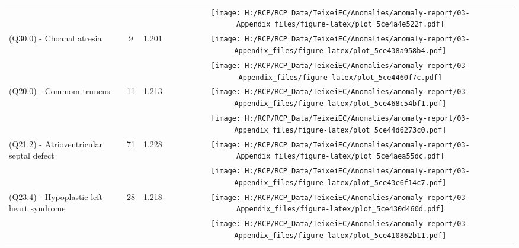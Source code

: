 \documentclass[
]{krantz}
\begin{document}
\begin{longtable}[t]{>{\raggedright\arraybackslash}m{4cm}cc>{}c}
\addlinespace
\cellcolor{gray!6}{(Q16.0, Q17.2) - Anotia / Microtia} & \cellcolor{gray!6}{14} & \cellcolor{gray!6}{1.218} & \cellcolor{gray!6}{}\texttt{[image: H:/RCP/RCP\_Data/TeixeiEC/Anomalies/anomaly-report/03-Appendix\_files/figure-latex/plot\_5ce4a4e522f.pdf]}\\
(Q30.0) - Choanal atresia & 9 & 1.201 & \texttt{[image: H:/RCP/RCP\_Data/TeixeiEC/Anomalies/anomaly-report/03-Appendix\_files/figure-latex/plot\_5ce438a958b4.pdf]}\\
\cellcolor{gray!6}{Selected congenital heart defects} & \cellcolor{gray!6}{211} & \cellcolor{gray!6}{1.226} & \cellcolor{gray!6}{}\texttt{[image: H:/RCP/RCP\_Data/TeixeiEC/Anomalies/anomaly-report/03-Appendix\_files/figure-latex/plot\_5ce4460f7c.pdf]}\\
(Q20.0) - Commom truncus & 11 & 1.213 & \texttt{[image: H:/RCP/RCP\_Data/TeixeiEC/Anomalies/anomaly-report/03-Appendix\_files/figure-latex/plot\_5ce468c54bf1.pdf]}\\
\cellcolor{gray!6}{(Q20.1, Q20.3, Q20.5) - Transposition of great vessels} & \cellcolor{gray!6}{59} & \cellcolor{gray!6}{1.228} & \cellcolor{gray!6}{}\texttt{[image: H:/RCP/RCP\_Data/TeixeiEC/Anomalies/anomaly-report/03-Appendix\_files/figure-latex/plot\_5ce44d6273c0.pdf]}\\
\addlinespace
(Q21.2) - Atrioventricular septal defect & 71 & 1.228 & \texttt{[image: H:/RCP/RCP\_Data/TeixeiEC/Anomalies/anomaly-report/03-Appendix\_files/figure-latex/plot\_5ce4aea55dc.pdf]}\\
\cellcolor{gray!6}{(Q21.3) - Tetralogy of Fallot} & \cellcolor{gray!6}{33} & \cellcolor{gray!6}{1.224} & \cellcolor{gray!6}{}\texttt{[image: H:/RCP/RCP\_Data/TeixeiEC/Anomalies/anomaly-report/03-Appendix\_files/figure-latex/plot\_5ce43c6f14c7.pdf]}\\
(Q23.4) - Hypoplastic left heart syndrome & 28 & 1.218 & \texttt{[image: H:/RCP/RCP\_Data/TeixeiEC/Anomalies/anomaly-report/03-Appendix\_files/figure-latex/plot\_5ce430d460d.pdf]}\\
\cellcolor{gray!6}{(Q25.1) - Coarctation of aorta} & \cellcolor{gray!6}{54} & \cellcolor{gray!6}{1.225} & \cellcolor{gray!6}{}\texttt{[image: H:/RCP/RCP\_Data/TeixeiEC/Anomalies/anomaly-report/03-Appendix\_files/figure-latex/plot\_5ce410862b11.pdf]}\\

\end{longtable}
\end{document}
